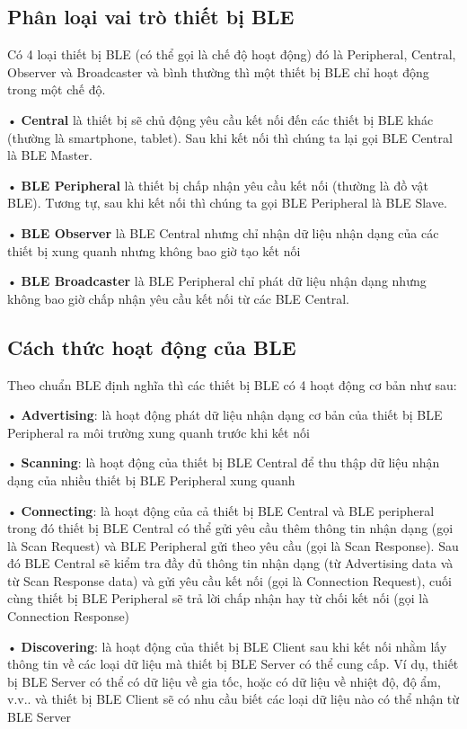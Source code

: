 \subsection{Phân loại vai trò thiết bị BLE}
Có 4 loại thiết bị BLE (có thể gọi là chế độ hoạt động) đó là Peripheral, Central, Observer và Broadcaster và bình thường thì một thiết bị BLE chỉ hoạt động  trong một chế độ.

• \textbf{Central} là thiết bị sẽ chủ động yêu cầu kết nối đến các thiết bị BLE khác (thường là smartphone, tablet). Sau khi kết nối thì chúng ta lại gọi BLE Central là  BLE Master.

• \textbf{BLE Peripheral} là thiết bị chấp nhận yêu cầu kết nối (thường là đồ vật BLE). Tương tự, sau khi kết nối thì chúng ta gọi BLE Peripheral là BLE Slave.

• \textbf{BLE Observer} là BLE Central nhưng chỉ nhận dữ liệu nhận dạng của các thiết bị xung quanh nhưng không bao giờ tạo kết nối

• \textbf{BLE Broadcaster} là BLE Peripheral chỉ phát dữ liệu nhận dạng nhưng không bao giờ chấp nhận yêu cầu kết nối từ các BLE Central.
\newpage

\subsection{Cách thức hoạt động của BLE}
Theo chuẩn BLE định nghĩa thì các thiết bị BLE có 4 hoạt động cơ bản như sau:

• \textbf{Advertising}: là hoạt động phát dữ liệu nhận dạng cơ bản của thiết bị BLE Peripheral ra môi trường xung quanh trước khi kết nối

• \textbf{Scanning}: là hoạt động của thiết bị BLE Central để thu thập dữ liệu nhận dạng của nhiều thiết bị BLE Peripheral xung quanh

• \textbf{Connecting}: là hoạt động của cả thiết bị BLE Central và BLE peripheral trong đó thiết bị BLE Central có thể gửi yêu cầu thêm thông tin nhận dạng (gọi là Scan Request) và BLE Peripheral gửi theo yêu cầu (gọi là Scan Response). Sau đó BLE Central sẽ kiểm tra đầy đủ thông tin nhận dạng (từ Advertising data và từ Scan Response data) và gửi yêu cầu kết nối (gọi là Connection Request), cuối cùng thiết bị BLE Peripheral sẽ trả lời chấp nhận hay từ chối kết nối (gọi là Connection Response)

• \textbf{Discovering}: là hoạt động của thiết bị BLE Client sau khi kết nối nhằm lấy thông tin về các loại dữ liệu mà thiết bị BLE Server có thể cung cấp. Ví dụ, thiết bị BLE Server có thể có dữ liệu về gia tốc, hoặc có dữ liệu về nhiệt độ, độ ẩm, v.v.. và thiết bị BLE Client sẽ có nhu cầu biết các loại dữ liệu nào có thể nhận từ BLE Server

